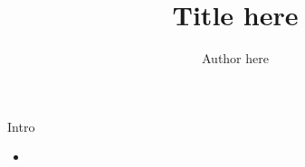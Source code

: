 \documentclass{beamer}
\title{Title here}
\author{Author here}
\institute{DECIDE}
\begin{document}
\begin{frame}
	\maketitle
\end{frame}

\begin{frame}{Intro}
	\begin{itemize}
		\item 
	\end{itemize}
\end{frame}
\end{document}
